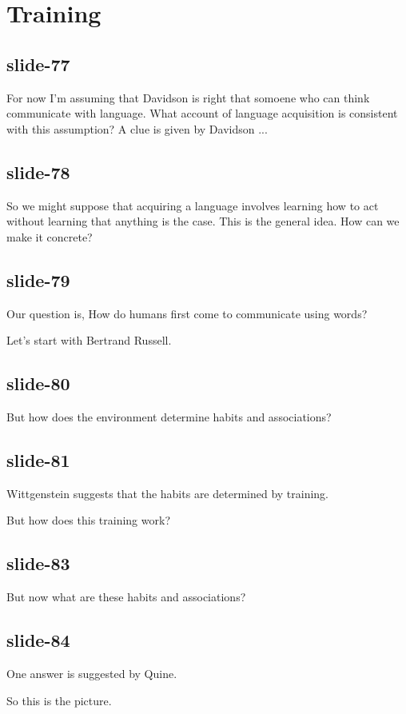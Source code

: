 \documentclass[12pt,\papersize]{extarticle}
\begin{document}
\section{Training}

\subsection{slide-77}
For now I'm assuming that Davidson is right that somoene who can think
communicate with language.
What account of language acquisition is consistent with this assumption?
A clue is given by Davidson ...

\subsection{slide-78}
So we might suppose that acquiring a language involves learning how to
act without learning that anything is the case.
This is the general idea.  How can we make it concrete?

\subsection{slide-79}
Our question is, How do humans first come to communicate using words?

Let's start with Bertrand Russell.

\subsection{slide-80}
But how does the environment determine habits and associations?

\subsection{slide-81}
Wittgenstein suggests that the habits are determined by training.

But how does this training work?

\subsection{slide-83}
But now what are these habits and associations?

\subsection{slide-84}
One answer is suggested by Quine.

So this is the picture.
\end{document}

